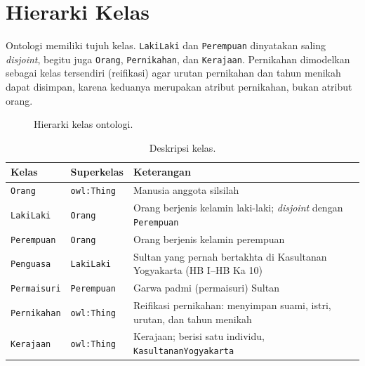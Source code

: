 \documentclass[11pt,a4paper]{article}
\begin{document}
\section{Hierarki Kelas}

Ontologi memiliki tujuh kelas. \texttt{LakiLaki} dan \texttt{Perempuan} dinyatakan saling \textit{disjoint}, begitu juga
\texttt{Orang}, \texttt{Pernikahan}, dan \texttt{Kerajaan}. Pernikahan dimodelkan sebagai kelas tersendiri (reifikasi)
agar urutan pernikahan dan tahun menikah dapat disimpan, karena keduanya merupakan atribut pernikahan, bukan atribut orang.

\begin{figure}[H]
\centering
{}
\caption{Hierarki kelas ontologi.}
\label{fig:hierarki}
\end{figure}

\begin{table}[H]
\centering
\caption{Deskripsi kelas.}
\label{tab:kelas}
\begin{tabularx}{\textwidth}{l l >{\raggedright\arraybackslash}X}
\toprule
\textbf{Kelas} & \textbf{Superkelas} & \textbf{Keterangan} \\
\midrule
\texttt{Orang} & \texttt{owl:Thing} & Manusia anggota silsilah \\
\texttt{LakiLaki} & \texttt{Orang} & Orang berjenis kelamin laki-laki; \textit{disjoint} dengan \texttt{Perempuan} \\
\texttt{Perempuan} & \texttt{Orang} & Orang berjenis kelamin perempuan \\
\texttt{Penguasa} & \texttt{LakiLaki} & Sultan yang pernah bertakhta di Kasultanan Yogyakarta (HB I--HB Ka 10) \\
\texttt{Permaisuri} & \texttt{Perempuan} & Garwa padmi (permaisuri) Sultan \\
\texttt{Pernikahan} & \texttt{owl:Thing} & Reifikasi pernikahan: menyimpan suami, istri, urutan, dan tahun menikah \\
\texttt{Kerajaan} & \texttt{owl:Thing} & Kerajaan; berisi satu individu, \texttt{KasultananYogyakarta} \\
\bottomrule
\end{tabularx}
\end{table}
\end{document}
